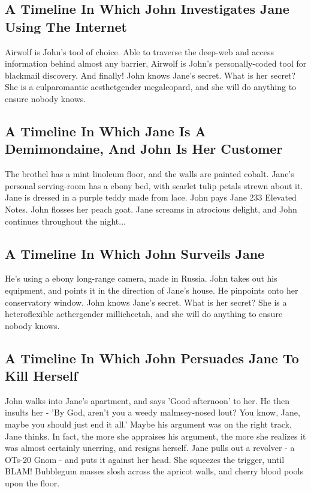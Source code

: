 \documentclass{article}
\begin{document}
\subsection{A Timeline In Which John Investigates Jane Using The Internet}


Airwolf is John's tool of choice. Able to traverse the deep{-}web and access information behind almost any barrier, Airwolf is John's personally{-}coded tool for blackmail discovery.
And finally!
John knows Jane's secret. What is her secret? She is a culparomantic aesthetgender megaleopard, and she will do anything to ensure nobody knows.
\subsection{A Timeline In Which Jane Is A Demimondaine, And John Is Her Customer}


The brothel has a mint linoleum floor, and the walls are painted cobalt.
Jane's personal serving{-}room has a ebony bed, with scarlet tulip petals strewn about it.
Jane is dressed in a purple teddy made from lace.
John pays Jane 233 Elevated Notes.
John flosses her peach goat.
Jane screams in atrocious delight, and John continues throughout the night...
\subsection{A Timeline In Which John Surveils Jane}


He's using a ebony long{-}range camera, made in Russia.
John takes out his equipment, and points it in the direction of Jane's house. He pinpoints onto her conservatory window.
John knows Jane's secret. What is her secret? She is a heteroflexible aethergender millicheetah, and she will do anything to ensure nobody knows.
\subsection{A Timeline In Which John Persuades Jane To Kill Herself}


John walks into Jane's apartment, and says 'Good afternoon' to her.
He then insults her {-} 'By God, aren't you a weedy malmsey{-}nosed lout?
You know, Jane, maybe you should just end it all.'
Maybe his argument was on the right track, Jane thinks.
In fact, the more she appraises his argument, the more she realizes it was almost certainly unerring, and resigns herself.
Jane pulls out a revolver {-} a OTs{-}20 Gnom {-} and puts it against her head.
She squeezes the trigger, until BLAM!
Bubblegum masses slosh across the apricot walls, and cherry blood pools upon the floor.
\end{document}
